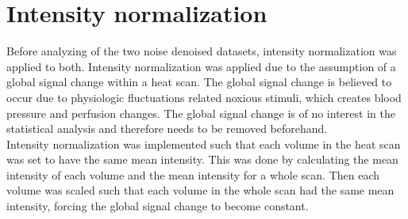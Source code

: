 \section{Intensity normalization}

Before analyzing of the two noise denoised datasets, intensity normalization was applied to both. Intensity normalization was applied due to the assumption of a global signal change within a heat scan. The global signal change is believed to occur due to physiologic fluctuations related noxious stimuli, which creates blood pressure and perfusion changes. The global signal change is of no interest in the statistical analysis and therefore needs to be removed beforehand. \cite{Macey2004} \\
Intensity normalization was implemented such that each volume in the heat scan was set to have the same mean intensity. This was done by calculating the mean intensity of each volume and the mean intensity for a whole scan. Then each volume was scaled such that each volume in the whole scan had the same mean intensity, forcing the global signal change to become constant.  